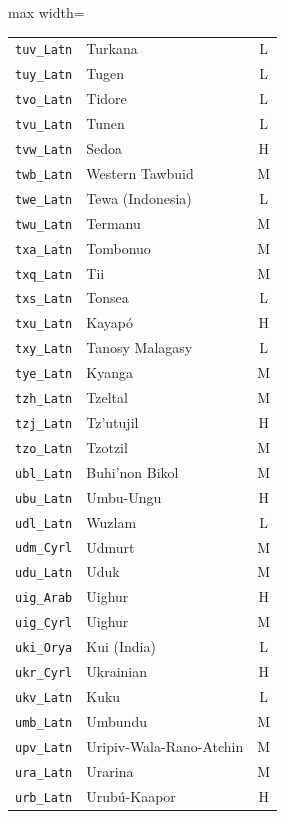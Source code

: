 {\begin{adjustbox}{max width=\textwidth}
\begin{tabular}{llc}
        \texttt{tuv\_Latn} & Turkana & L \\
        \texttt{tuy\_Latn} & Tugen & L \\
        \texttt{tvo\_Latn} & Tidore & L \\
        \texttt{tvu\_Latn} & Tunen & L \\
        \texttt{tvw\_Latn} & Sedoa & H \\
        \texttt{twb\_Latn} & Western Tawbuid & M \\
        \texttt{twe\_Latn} & Tewa (Indonesia) & L \\
        \texttt{twu\_Latn} & Termanu & M \\
        \texttt{txa\_Latn} & Tombonuo & M \\
        \texttt{txq\_Latn} & Tii & M \\
        \texttt{txs\_Latn} & Tonsea & L \\
        \texttt{txu\_Latn} & Kayapó & H \\
        \texttt{txy\_Latn} & Tanosy Malagasy & L \\
        \texttt{tye\_Latn} & Kyanga & M \\
        \texttt{tzh\_Latn} & Tzeltal & M \\
        \texttt{tzj\_Latn} & Tz'utujil & H \\
        \texttt{tzo\_Latn} & Tzotzil & M \\
        \texttt{ubl\_Latn} & Buhi'non Bikol & M \\
        \texttt{ubu\_Latn} & Umbu-Ungu & H \\
        \texttt{udl\_Latn} & Wuzlam & L \\
        \texttt{udm\_Cyrl} & Udmurt & M \\
        \texttt{udu\_Latn} & Uduk & M \\
        \texttt{uig\_Arab} & Uighur & H \\
        \texttt{uig\_Cyrl} & Uighur & M \\
        \texttt{uki\_Orya} & Kui (India) & L \\
        \texttt{ukr\_Cyrl} & Ukrainian & H \\
        \texttt{ukv\_Latn} & Kuku & L \\
        \texttt{umb\_Latn} & Umbundu & M \\
        \texttt{upv\_Latn} & Uripiv-Wala-Rano-Atchin & M \\
        \texttt{ura\_Latn} & Urarina & M \\
        \texttt{urb\_Latn} & Urubú-Kaapor & H \\

\end{tabular}
\end{adjustbox}}
